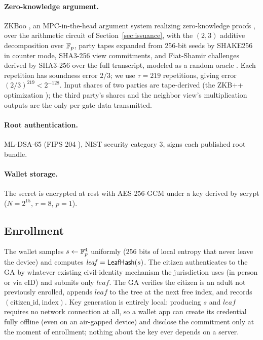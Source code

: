 \documentclass[11pt]{article}
\theoremstyle{definition}
\begin{document}
\paragraph{Zero-knowledge argument.} ZKBoo \cite{zkboo}, an MPC-in-the-head
\cite{ikos} argument system realizing zero-knowledge proofs \cite{gmr}, over the
arithmetic circuit of Section~\ref{sec:issuance}, with the $(2,3)$ additive decomposition
over $\mathbb{F}_p$, party tapes expanded from 256-bit seeds by SHAKE256 in counter mode, SHA3-256
view commitments, and Fiat-Shamir challenges derived by SHA3-256 over the full transcript,
modeled as a random oracle \cite{bellrog}. Each repetition has soundness error $2/3$; we
use $\tau = 219$ repetitions, giving error $(2/3)^{219} < 2^{-128}$. Input shares of two
parties are tape-derived (the ZKB++ optimization \cite{picnic}); the third party's shares
and the neighbor view's multiplication outputs are the only per-gate data transmitted.

\paragraph{Root authentication.} ML-DSA-65 (FIPS 204 \cite{fips204}), NIST security
category 3, signs each published root bundle.

\paragraph{Wallet storage.} The secret is encrypted at rest with AES-256-GCM under a key
derived by scrypt ($N = 2^{15}$, $r = 8$, $p = 1$).

\subsection{Enrollment}

The wallet samples $s \leftarrow \mathbb{F}_p^4$ uniformly (256 bits of local entropy that never
leave the device) and computes $\mathit{leaf} = \mathsf{LeafHash}(s)$. The citizen authenticates
to the GA by whatever existing civil-identity mechanism the jurisdiction uses (in person
or via eID) and submits only $\mathit{leaf}$. The GA verifies the citizen is an adult not
previously enrolled, appends $\mathit{leaf}$ to the tree at the next free index, and
records $(\mathrm{citizen\_id}, \mathrm{index})$. Key generation is entirely local:
producing $s$ and $\mathit{leaf}$ requires no network connection at all, so a wallet app
can create its credential fully offline (even on an air-gapped device) and disclose the
commitment only at the moment of enrollment; nothing about the key ever depends on a
server.
\end{document}

